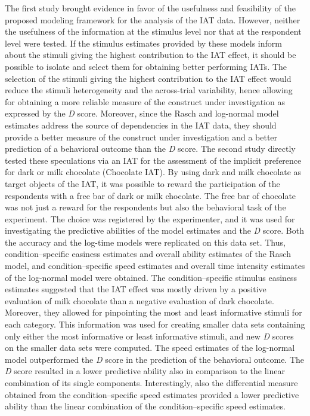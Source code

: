 \documentclass[12pt]{book}
\begin{document}
The first study brought evidence in favor of the usefulness and feasibility of the proposed  modeling framework for the analysis of the IAT data.
However, neither the usefulness of the information at the stimulus level nor that at the respondent level were tested. 
If the stimulus estimates provided by these models inform about the stimuli giving the highest contribution to the IAT effect, it should be possible to isolate and select them for obtaining better performing IATs. 
The selection of the stimuli giving the highest contribution to the IAT effect would reduce the stimuli heterogeneity and the across-trial variability, hence allowing for obtaining a more reliable measure of the construct under investigation as expressed by the \emph{D} score. 
Moreover, since the Rasch and log-normal model estimates address the source of dependencies in the IAT data, they should provide a better measure of the  construct under investigation and a better prediction of a behavioral outcome than the \emph{D} score.
The second study directly tested these speculations via an IAT for the assessment of the implicit preference for dark or milk chocolate (Chocolate IAT). By using dark and milk chocolate as target objects of the IAT, it was possible to reward the participation of the respondents with a free bar of dark or milk chocolate.  The free bar of chocolate was not just a reward for the respondents but also the behavioral task of the experiment.  The choice was registered by the experimenter, and it was used for investigating the predictive abilities of the model estimates and the \emph{D} score.
Both the accuracy and the log-time models were replicated on this data set. 
Thus, condition--specific easiness estimates and overall ability estimates of the Rasch model, and condition--specific speed estimates and overall time intensity estimates of the log-normal model were obtained. 
The condition--specific stimulus easiness estimates suggested that the IAT effect was mostly driven by a positive evaluation of milk chocolate than a negative evaluation of dark chocolate. Moreover, they allowed for pinpointing the most and least informative stimuli for each category. This information was used for creating smaller data sets containing only either the most informative or least informative stimuli, and new \emph{D} scores on the smaller data sets were computed.
The speed estimates of the log-normal model outperformed the \emph{D} score in the prediction of the behavioral outcome. 
The \emph{D} score resulted in a lower predictive ability also in comparison to the linear combination of its single components.
Interestingly, also the differential measure obtained from the condition--specific speed estimates provided a lower predictive ability than the linear combination of the condition--specific speed estimates. 
\end{document}
